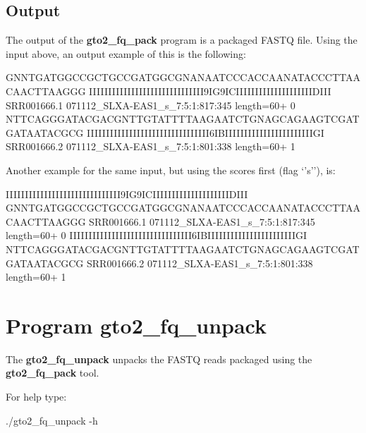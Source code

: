 \documentclass[11pt,]{krantz}
\newenvironment{Shaded}{\begin{snugshade}}{\end{snugshade}}
\newcommand{\ExtensionTok}[1]{#1}
\newcommand{\NormalTok}[1]{#1}
\begin{document}
\subsection*{Output}\label{output-12}


The output of the \textbf{gto2\_fq\_pack} program is a packaged FASTQ
file. Using the input above, an output example of this is the following:

\begin{Shaded}
\begin{Highlighting}[]
\ExtensionTok{GNNTGATGGCCGCTGCCGATGGCGNANAATCCCACCAANATACCCTTAACAACTTAAGGG}
\ExtensionTok{IIIIIIIIIIIIIIIIIIIIIIIIIIIIII9IG9ICIIIIIIIIIIIIIIIIIIIIDIII}
\ExtensionTok{SRR001666.1}\NormalTok{ 071112_SLXA-EAS1_s_7:5:1:817:345 length=60+ 0}
\ExtensionTok{NTTCAGGGATACGACGNTTGTATTTTAAGAATCTGNAGCAGAAGTCGATGATAATACGCG}
\ExtensionTok{IIIIIIIIIIIIIIIIIIIIIIIIIIIIIIII6IBIIIIIIIIIIIIIIIIIIIIIIIGI}
\ExtensionTok{SRR001666.2}\NormalTok{ 071112_SLXA-EAS1_s_7:5:1:801:338 length=60+ 1}
\end{Highlighting}
\end{Shaded}

Another example for the same input, but using the scores first (flag
`'s''), is:

\begin{Shaded}
\begin{Highlighting}[]
\ExtensionTok{IIIIIIIIIIIIIIIIIIIIIIIIIIIIII9IG9ICIIIIIIIIIIIIIIIIIIIIDIII}
\ExtensionTok{GNNTGATGGCCGCTGCCGATGGCGNANAATCCCACCAANATACCCTTAACAACTTAAGGG}
\ExtensionTok{SRR001666.1}\NormalTok{ 071112_SLXA-EAS1_s_7:5:1:817:345 length=60+ 0}
\ExtensionTok{IIIIIIIIIIIIIIIIIIIIIIIIIIIIIIII6IBIIIIIIIIIIIIIIIIIIIIIIIGI}
\ExtensionTok{NTTCAGGGATACGACGNTTGTATTTTAAGAATCTGNAGCAGAAGTCGATGATAATACGCG}
\ExtensionTok{SRR001666.2}\NormalTok{ 071112_SLXA-EAS1_s_7:5:1:801:338 length=60+ 1}
\end{Highlighting}
\end{Shaded}

\section{Program gto2\_fq\_unpack}\label{program-gto2_fq_unpack}

The \textbf{gto2\_fq\_unpack} unpacks the FASTQ reads packaged using the
\textbf{gto2\_fq\_pack} tool.

For help type:

\begin{Shaded}
\begin{Highlighting}[]
\ExtensionTok{./gto2_fq_unpack}\NormalTok{ -h}
\end{Highlighting}
\end{Shaded}
\end{document}
